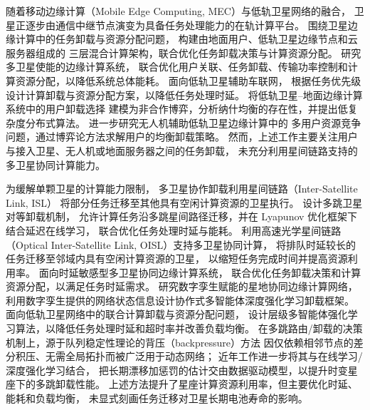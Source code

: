 \documentclass[a4paper,11pt]{article}
\begin{document}
随着移动边缘计算（Mobile Edge Computing, MEC）与低轨卫星网络的融合，
卫星正逐步由通信中继节点演变为具备任务处理能力的在轨计算平台。
围绕卫星边缘计算中的任务卸载与资源分配问题，
\cite{tang2021hybrid}构建由地面用户、低轨卫星边缘节点和云服务器组成的
三层混合计算架构，联合优化任务卸载决策与计算资源分配。
\cite{ms2024energy}研究多卫星使能的边缘计算系统，
联合优化用户关联、任务卸载、传输功率控制和计算资源分配，以降低系统总体能耗。
\cite{wang2025priority}面向低轨卫星辅助车联网，
根据任务优先级设计计算卸载与资源分配方案，以降低任务处理时延。
\cite{chen2025gdco}将低轨卫星--地面边缘计算系统中的用户卸载选择
建模为非合作博弈，分析纳什均衡的存在性，并提出低复杂度分布式算法。
\cite{chen2025uavgame}进一步研究无人机辅助低轨卫星边缘计算中的
多用户资源竞争问题，通过博弈论方法求解用户的均衡卸载策略。
然而，上述工作主要关注用户与接入卫星、无人机或地面服务器之间的任务卸载，
未充分利用星间链路支持的多卫星协同计算能力。



为缓解单颗卫星的计算能力限制，
多卫星协作卸载利用星间链路（Inter-Satellite Link, ISL）
将部分任务迁移至其他具有空闲计算资源的卫星执行。
\cite{zhang2024mhspo}设计多跳卫星对等卸载机制，
允许计算任务沿多跳星间路径迁移，并在 Lyapunov 优化框架下结合延迟在线学习，
联合优化任务处理时延与能耗。
\cite{zhang2024oisl}利用高速光学星间链路
（Optical Inter-Satellite Link, OISL）支持多卫星协同计算，
将排队时延较长的任务迁移至邻域内具有空闲计算资源的卫星，
以缩短任务完成时间并提高资源利用率。
\cite{li2025dsms}面向时延敏感型多卫星协同边缘计算系统，
联合优化任务卸载决策和计算资源分配，以满足任务时延需求。
\cite{ji2023dtsat}研究数字孪生赋能的星地协同边缘计算网络，
利用数字孪生提供的网络状态信息设计协作式多智能体深度强化学习卸载框架。
\cite{lai2025hmadrl}面向低轨卫星网络中的联合计算卸载与资源分配问题，
设计层级多智能体强化学习算法，以降低任务处理时延和超时率并改善负载均衡。
在多跳路由/卸载的决策机制上，源于队列稳定性理论的背压（backpressure）方法\cite{tassiulas1992}
因仅依赖相邻节点的差分积压、无需全局拓扑而被广泛用于动态网络；
近年工作\cite{zhang2024mhspo,msndo2025}进一步将其与在线学习/深度强化学习结合，
把长期漂移加惩罚的估计交由数据驱动模型，以提升时变星座下的多跳卸载性能。
上述方法提升了星座计算资源利用率，但主要优化时延、能耗和负载均衡，
未显式刻画任务迁移对卫星长期电池寿命的影响。
\end{document}
